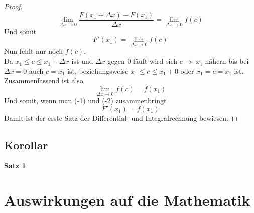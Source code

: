 \documentclass[fontsize=12pt,paper=a4,DIV12,cleardoublepage=empty, 
liststotoc,idxtotoc,bibtotoc]{article}
\theoremstyle{plain}
\newtheorem{satz}{Satz}[subsection]
\theoremstyle{definition}
\begin{document}
\begin{proof}
\begin{equation}
			\lim \limits_{\Delta x \to 0} \frac{F(x_1+\Delta x)-F(x_1)}{\Delta x}=\lim \limits_{\Delta x \to 0}f(c)
		\end{equation}
		Und somit
		\begin{equation}
			F'(x_1)=\lim \limits_{\Delta x \to 0}f(c)
		\end{equation}
		Nun fehlt nur noch $f(c)$.\\ Da $x_1 \leq c \leq x_1+\Delta x$ ist und $\Delta x$ gegen $0$ läuft wird sich $c\to$ $x_1$ nähern bis bei $\Delta x=0$ auch $c = x_1$ ist, beziehungsweise $x_1 \leq c \leq x_1 + 0$ oder $x_1 = c = x_1$ ist.\\Zusammenfassend ist also
		\begin{equation}
			\lim \limits_{\Delta x \to 0} f(c) = f(x_1)
		\end{equation}
		Und somit, wenn man (-1) und (-2) zusammenbringt
		\begin{equation}
			F'(x_1)=f(x_1)
		\end{equation}
		Damit ist der erste Satz der Differential- und Integralrechnung bewiesen.
	\end{proof}
	\newpage
	
	\subsection{Korollar}
	\begin{satz}
		
	\end{satz}
		
	
	\section{Auswirkungen auf die Mathematik}
\end{document}
